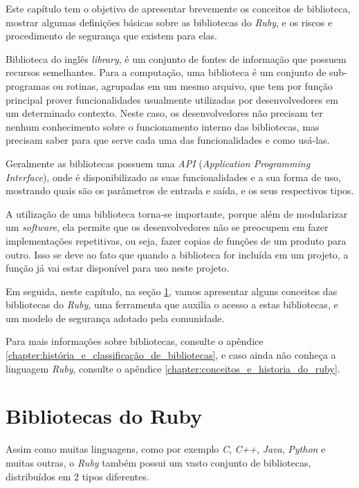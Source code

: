 Este capítulo tem o objetivo de apresentar brevemente os conceitos de biblioteca,
mostrar algumas definições básicas sobre as bibliotecas do \emph{Ruby}, e os riscos
e procedimento de segurança que existem para elas.

Biblioteca do inglês \emph{library}, é um conjunto de fontes de informação que possuem recursos
semelhantes. Para a computação, uma biblioteca é um conjunto de sub-programas ou
rotinas, agrupadas em um mesmo arquivo, que tem por função principal prover funcionalidades
usualmente utilizadas por desenvolvedores em um determinado contexto. Neste caso, os
desenvolvedores não precisam ter nenhum conhecimento sobre o funcionamento interno das
bibliotecas, mas precisam saber para que serve cada uma das funcionalidades e como usá-las.

Geralmente as bibliotecas possuem uma \emph{API} (\emph{Application Programming Interface}), onde
é disponibilizado as suas funcionalidades e a sua forma de uso, mostrando quais são os
parâmetros de entrada e saída, e os seus respectivos tipos.

A utilização de uma biblioteca torna-se importante, porque além de modularizar um \emph{software}, ela
permite que os desenvolvedores não se preocupem em fazer implementações repetitivas, ou seja, fazer
copias de funções de um produto para outro. Isso se deve ao fato que quando a biblioteca for
incluída em um projeto, a função já vai estar disponível para uso neste projeto.

Em seguida, neste capítulo, na seção \ref{section:bibliotecas_do_ruby}, vamos apresentar alguns
conceitos das bibliotecas do \emph{Ruby}, uma ferramenta que auxilia o acesso a estas bibliotecas,
e um modelo de segurança adotado pela comunidade.

Para mais informações sobre bibliotecas, consulte o apêndice
\ref{chapter:história_e_classificação_de_bibliotecas}, e caso ainda não conheça a linguagem
\emph{Ruby}, consulte o apêndice \ref{chapter:conceitos_e_historia_do_ruby}.


\section{Bibliotecas do Ruby}
\label{section:bibliotecas_do_ruby}

Assim como muitas linguagens, como por exemplo \emph{C}, \emph{C++}, \emph{Java}, \emph{Python} e muitas
outras, o \emph{Ruby} também possui um vasto conjunto de bibliotecas, distribuídos em 2 tipos diferentes.

